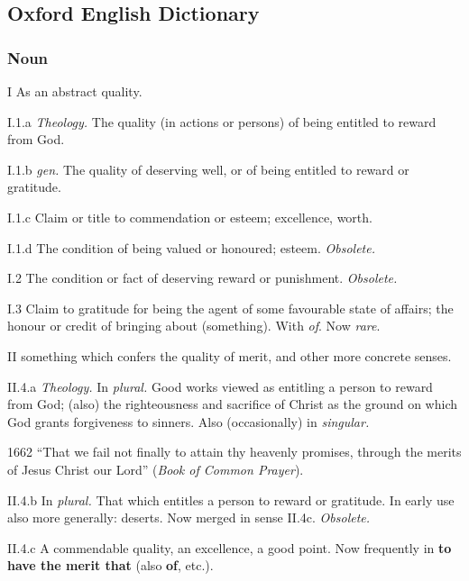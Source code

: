 \subsection{Oxford English Dictionary} %
	\label{MERIT-OED}
	
	\subsubsection{Noun}

		\begin{compactitem}
			\item[I] As an abstract quality.
			\item[I.1.a] \textit{Theology.} The quality (in actions or persons) of being entitled to reward from God.
			\item[I.1.b] \textit{gen.} The quality of deserving well, or of being entitled to reward or gratitude.
			\item[I.1.c] Claim or title to commendation or esteem; excellence, worth.
			\item[I.1.d] The condition of being valued or honoured; esteem. \textit{Obsolete.}
			\item[I.2] The condition or fact of deserving reward or punishment. \textit{Obsolete.}
			\item[I.3] Claim to gratitude for being the agent of some favourable state of affairs; the honour or credit of bringing about (something). With \textit{of}. Now \textit{rare}.
			\item[II] something which confers the quality of merit, and other more concrete senses.
			\item[II.4.a] \textit{Theology.} In \textit{plural.} Good works viewed as entitling a person to reward from God; (also) the righteousness and sacrifice of Christ as the ground on which God grants forgiveness to sinners. Also (occasionally) in \textit{singular.}
				\begin{compactitem}
					\item[1662] ``That we fail not finally to attain thy heavenly promises, through the merits of Jesus Christ our Lord'' (\textit{Book of Common Prayer}).
				\end{compactitem}
			\item[II.4.b] In \textit{plural.} That which entitles a person to reward or gratitude. In early use also more generally: deserts. Now merged in sense II.4c. \textit{Obsolete.}
			\item[II.4.c] A commendable quality, an excellence, a good point. Now frequently in \textbf{to have the merit that} (also \textbf{of}, etc.).

\end{compactitem}
